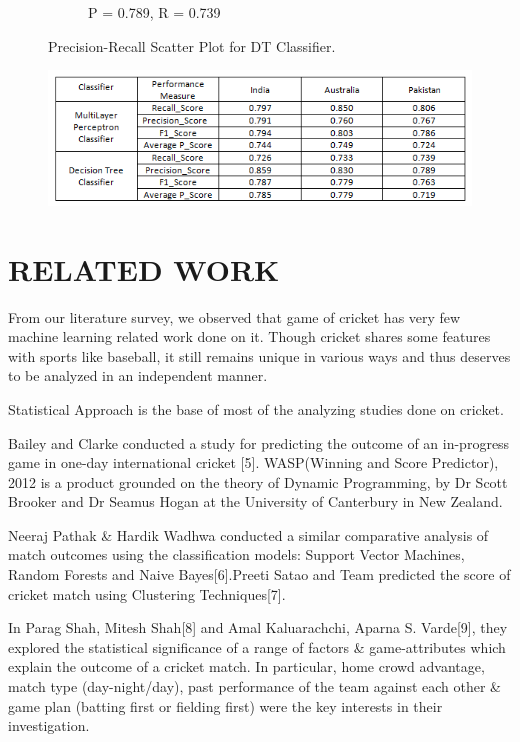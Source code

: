 \documentclass[a4paper, 10pt, conference]{IEEEtran}
\begin{document}
\begin{figure}[h!]
\begin{subfigure}[b]{0.4\linewidth}
    \caption{P = 0.789, R = 0.739}
  \end{subfigure}
  \caption{Precision-Recall Scatter Plot for DT Classifier.}
  \label{fig:dtclfPlots}
\end{figure}

\begin{figure}[h!]
  \includegraphics[width=\linewidth]{TeamScore.png}
  \label{fig:results}
\end{figure}


\section{RELATED WORK}
From our literature survey, we observed that game of cricket has very few machine learning related work done on it. Though cricket shares some features with sports like baseball, it still remains unique in various ways and thus deserves to be analyzed in an independent manner.

Statistical Approach is the base of most of the analyzing studies done on cricket.

Bailey and Clarke conducted a study for predicting the outcome of an in-progress game in one-day international cricket [5]. WASP(Winning and Score Predictor), 2012 is a product grounded on the theory of Dynamic Programming, by Dr Scott Brooker and Dr Seamus Hogan at the University of Canterbury in New Zealand.

Neeraj Pathak \& Hardik Wadhwa conducted a similar comparative analysis of match outcomes using the classification models: Support Vector Machines, Random Forests and Naive Bayes[6].Preeti Satao and Team predicted the score of cricket match using Clustering Techniques[7].

In Parag Shah, Mitesh Shah[8] and Amal Kaluarachchi, Aparna S. Varde[9], they explored the statistical significance of a range of factors \& game-attributes which explain the outcome of a cricket match. In particular, home crowd advantage, match type (day-night/day), past performance of the team against each other \& game plan (batting first or fielding first) were the key interests in their investigation.
\end{document}
